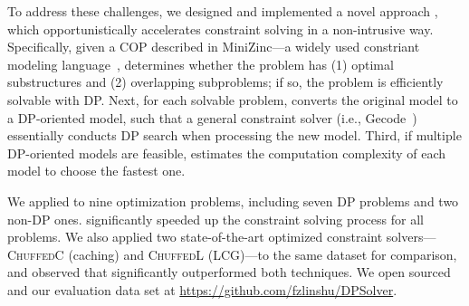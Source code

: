 To address these challenges, we designed and implemented a novel approach \tool, which opportunistically accelerates constraint solving in a non-intrusive way. 
Specifically, given a COP described in MiniZinc---a widely used constriant modeling language~\cite{nethercote2007minizinc}, \tool determines  whether the problem has (1) optimal substructures and (2) overlapping subproblems; if so, the problem is efficiently solvable with DP. Next, for each solvable problem, \tool
converts the original model to a DP-oriented model, such that a general constraint solver (i.e., Gecode~\cite{schulte2006gecode}) essentially conducts DP search when processing the new model. 
Third, if multiple DP-oriented models are feasible, \tool estimates the computation complexity of each model to choose the fastest one.  

We applied \tool to nine optimization problems, 
including seven DP problems and two non-DP ones. \tool significantly speeded up the constraint solving process for all problems.  
We also applied two state-of-the-art optimized constraint solvers---\textsc{ChuffedC} (caching) and \textsc{ChuffedL} (LCG)---to the same dataset for comparison, and observed that \tool significantly outperformed both techniques. We open sourced \tool and our evaluation data set at \url{https://github.com/fzlinshu/DPSolver}.



	
	

